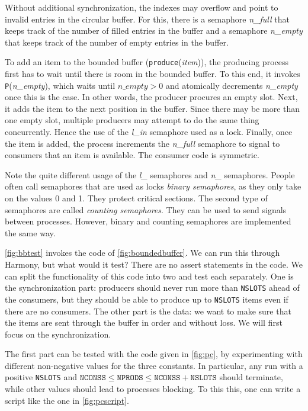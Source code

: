 \documentclass{report}
\begin{document}
Without additional synchronization, the indexes may overflow and point to invalid
entries in the circular buffer.
For this, there is a semaphore \textit{n\_full} that
keeps track of the number of filled entries in the buffer and a semaphore
\textit{n\_empty} that keeps track of the number of empty entries in the buffer.

To add an item to the bounded buffer (\texttt{produce}(\textit{item})), the producing
process first has to wait until there is room in the bounded buffer.
To this end, it invokes \texttt{P}(\textit{n\_empty}), which waits until
$\mathit{n\_empty} > 0$ and atomically decrements \textit{n\_empty} once this
is the case.  In other words, the producer procures an empty slot.
Next, it adds the item to the next position in the buffer.
Since there may be more than one empty slot, multiple producers may attempt
to do the same thing concurrently.  Hence the use of the \textit{l\_in}
semaphore used as a lock.  Finally, once the item is added, the process
increments the \textit{n\_full} semaphore to signal to consumers that
an item is available.
The consumer code is symmetric.

Note the quite different usage of the \textit{l\_} semaphores and \textit{n\_}
semaphores.
People often call semaphores that are used as locks \emph{binary semaphores},
%
as they only take on the values 0 and 1.
They protect critical sections.
The second type of semaphores are called \emph{counting semaphores}.
%
They can be used to send signals between processes.
However, binary and counting semaphores are implemented the same way.

\autoref{fig:bbtest} invokes the code of \autoref{fig:boundedbuffer}.
We can run this through Harmony, but what would it test?  There are
no assert statements in the code.  We can split the functionality
of this code into two and test each separately.  One is the
synchronization part: producers should never run more than
\texttt{NSLOTS} ahead of the consumers, but they should be able to
produce up to \texttt{NSLOTS} items even if there are no consumers.
The other part is the data: we want to make sure that the items are
sent through the buffer in order and without loss.  We will first
focus on the synchronization.

The first part can be tested with the code given in \autoref{fig:pc}, by
experimenting with different non-negative values for the three constants.
In particular, any run with a positive \texttt{NSLOTS} and
$\mathtt{NCONSS} \le \mathtt{NPRODS} \le \mathtt{NCONSS} + \mathtt{NSLOTS}$
should terminate, while other values should lead to processes blocking.
To this this, one can write a script like the one in \autoref{fig:pcscript}.
\end{document}
